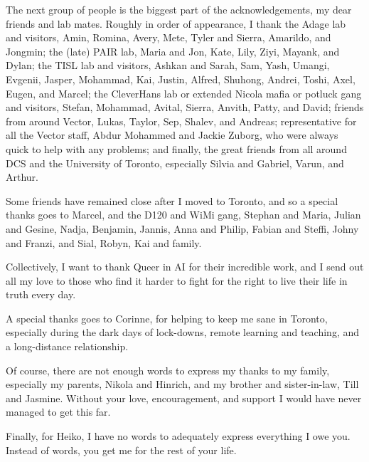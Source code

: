 The next group of people is the biggest part of the acknowledgements, my dear friends and lab mates.
Roughly in order of appearance, I thank
the Adage lab and visitors, Amin, Romina, Avery, Mete, Tyler and Sierra, Amarildo, and Jongmin; the (late) PAIR lab, Maria and Jon, Kate, Lily, Ziyi, Mayank, and Dylan; the TISL lab and visitors, Ashkan and Sarah, Sam, Yash, Umangi, Evgenii, Jasper, Mohammad, Kai, Justin, Alfred, Shuhong, Andrei, Toshi, Axel, Eugen, and Marcel; the CleverHans lab or extended Nicola mafia or potluck gang and visitors, Stefan, Mohammad, Avital, Sierra, Anvith, Patty, and David; friends from around Vector, Lukas, Taylor, Sep, Shalev, and Andreas; representative for all the Vector staff, Abdur Mohammed and Jackie Zuborg, who were always quick to help with any problems; and finally, the great friends from all around DCS and the University of Toronto, especially Silvia and Gabriel, Varun, and Arthur.

Some friends have remained close after I moved to Toronto, and so a special thanks goes to Marcel, and the D120 and WiMi gang, Stephan and Maria, Julian and Gesine, Nadja, Benjamin, Jannis, Anna and Philip, Fabian and Steffi, Johny and Franzi, and Sial, Robyn, Kai and family.

Collectively, I want to thank Queer in AI for their incredible work, and I send out all my love to those who find it harder to fight for the right to live their life in truth every day.

A special thanks goes to Corinne, for helping to keep me sane in Toronto, especially during the dark days of lock-downs, remote learning and teaching, and a long-distance relationship.

Of course, there are not enough words to express my thanks to my family, especially my parents, Nikola and Hinrich, and my brother and sister-in-law, Till and Jasmine.
Without your love, encouragement, and support I would have never managed to get this far.

Finally, for Heiko, I have no words to adequately express everything I owe you.
Instead of words, you get me for the rest of your life.
